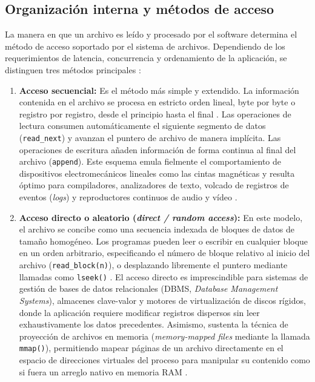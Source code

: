 \documentclass[12pt]{article}
\begin{document}
\subsection{Organización interna y métodos de acceso}
\label{subsec:organizacionInternaMetodosAcceso}

La manera en que un archivo es leído y procesado por el software determina el método de acceso soportado por el sistema de archivos. Dependiendo de los requerimientos de latencia, concurrencia y ordenamiento de la aplicación, se distinguen tres métodos principales \parencite[\S 10.2, pp.\ 337--340]{silberschatz2006fundamentos}:

\begin{enumerate}[noitemsep, topsep=2pt]
    \item \textbf{Acceso secuencial:} Es el método más simple y extendido. La información contenida en el archivo se procesa en estricto orden lineal, byte por byte o registro por registro, desde el principio hasta el final \parencite[\S 12.2, p.\ 556]{stallings2018operating}. Las operaciones de lectura consumen automáticamente el siguiente segmento de datos (\texttt{read\_next}) y avanzan el puntero de archivo de manera implícita. Las operaciones de escritura añaden información de forma continua al final del archivo (\texttt{append}). Este esquema emula fielmente el comportamiento de dispositivos electromecánicos lineales como las cintas magnéticas y resulta óptimo para compiladores, analizadores de texto, volcado de registros de eventos (\textit{logs}) y reproductores continuos de audio y vídeo \parencite[\S 10.2.1, p.\ 337]{silberschatz2006fundamentos}.
    \item \textbf{Acceso directo o aleatorio (\textit{direct / random access}):} En este modelo, el archivo se concibe como una secuencia indexada de bloques de datos de tamaño homogéneo. Los programas pueden leer o escribir en cualquier bloque en un orden arbitrario, especificando el número de bloque relativo al inicio del archivo (\texttt{read\_block(n)}), o desplazando libremente el puntero mediante llamadas como \texttt{lseek()} \parencite[\S 10.2.2, p.\ 338]{silberschatz2006fundamentos}. El acceso directo es imprescindible para sistemas de gestión de bases de datos relacionales (DBMS, \textit{Database Management Systems}), almacenes clave-valor y motores de virtualización de discos rígidos, donde la aplicación requiere modificar registros dispersos sin leer exhaustivamente los datos precedentes. Asimismo, sustenta la técnica de proyección de archivos en memoria (\textit{memory-mapped files} mediante la llamada \texttt{mmap()}), permitiendo mapear páginas de un archivo directamente en el espacio de direcciones virtuales del proceso para manipular su contenido como si fuera un arreglo nativo en memoria RAM \parencite[\S 8.2.4, pp.\ 427--428]{carretero2001sistemas}.

\end{enumerate}
\end{document}
